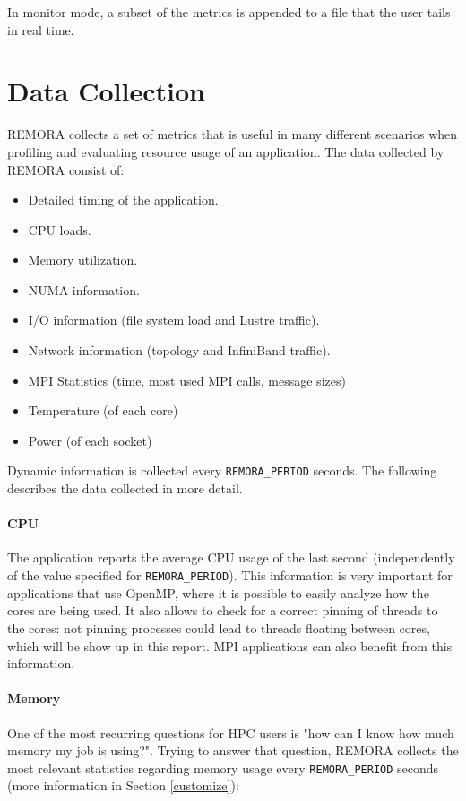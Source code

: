 \documentclass[10pt,a4paper]{report}
\begin{document}
In monitor mode, a subset of the metrics is appended to a file that the user tails in real time.

\section{Data Collection}
REMORA collects a set of metrics that is useful in many different scenarios when profiling and evaluating
resource usage of an application. The data collected by REMORA consist of:

\begin{itemize}
\item Detailed timing of the application.
\item CPU loads.
\item Memory utilization.
\item NUMA information.
\item I/O information (file system load and Lustre traffic).
\item Network information (topology and InfiniBand traffic).
\item MPI Statistics (time, most used MPI calls, message sizes)
\item Temperature (of each core)
\item Power (of each socket)
\end{itemize}

Dynamic information is collected every \texttt{REMORA\_PERIOD} seconds. The following describes the data collected in more detail. 

\paragraph{CPU}
The application reports the average CPU usage of the last second (independently of the value specified for \texttt{REMORA\_PERIOD}). This information is very important for applications that use OpenMP, where it is possible to easily analyze how the cores are being used. It also allows to check for a correct pinning of threads to the cores: not pinning processes could lead to threads floating between cores, which will be show up in this report. MPI applications can also benefit from this information.

\paragraph{Memory}
One of the most recurring questions for HPC users is "how can I know how much memory my job is using?". Trying to answer that question, REMORA collects the most relevant statistics regarding memory usage every \texttt{REMORA\_PERIOD} seconds (more information in Section \ref{customize}):
\end{document}
